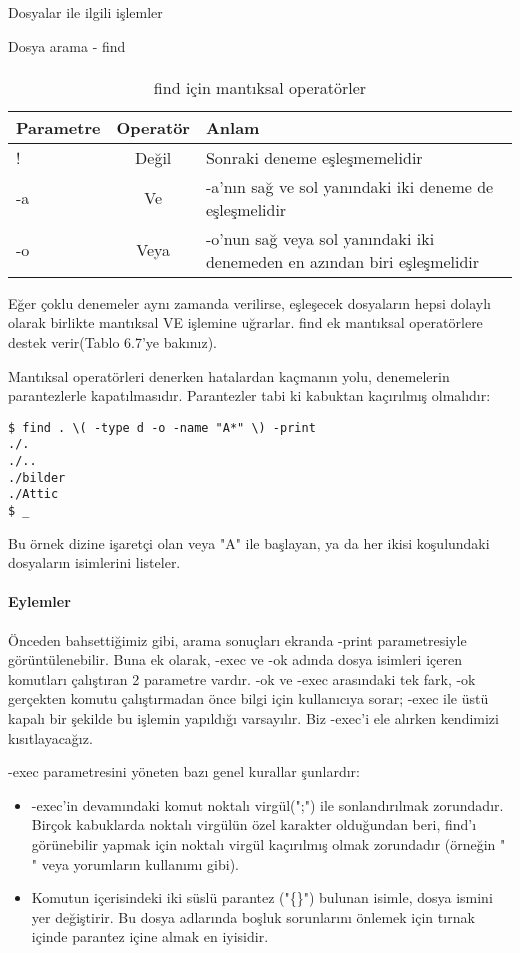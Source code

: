 \begin{section}{Dosyalar ile ilgili işlemler}
\begin{subsection}{Dosya arama - find}
\paragraph{}{
\begin {table}[H]
\caption {find için mantıksal operatörler} \label{tab:title} 
\begin{tabular}{l c l}
\hline
Parametre & Operatör & Anlam\\
\hline
! & Değil & Sonraki deneme eşleşmemelidir\\
-a & Ve & -a'nın sağ ve sol yanındaki iki deneme de eşleşmelidir\\
-o & Veya & -o'nun sağ veya sol yanındaki iki denemeden en azından biri eşleşmelidir\\
\hline
\end{tabular}
\end {table}
}

Eğer çoklu denemeler aynı zamanda verilirse, eşleşecek dosyaların hepsi dolaylı olarak birlikte mantıksal VE işlemine uğrarlar. find ek mantıksal operatörlere destek verir(Tablo 6.7'ye bakınız).

Mantıksal operatörleri denerken hatalardan kaçmanın yolu, denemelerin parantezlerle kapatılmasıdır. Parantezler tabi ki kabuktan kaçırılmış olmalıdır:

\begin{verbatim}
$ find . \( -type d -o -name "A*" \) -print
./.
./..
./bilder
./Attic
$ _
\end{verbatim}

Bu örnek dizine işaretçi olan veya "A" ile başlayan, ya da her ikisi koşulundaki dosyaların isimlerini listeler.

\paragraph{Eylemler} Önceden bahsettiğimiz gibi, arama sonuçları ekranda -print parametresiyle görüntülenebilir. Buna ek olarak, -exec ve -ok adında dosya isimleri içeren komutları çalıştıran 2 parametre vardır. -ok ve -exec arasındaki tek fark, -ok gerçekten komutu çalıştırmadan önce bilgi için kullanıcıya sorar; -exec ile üstü kapalı bir şekilde bu işlemin yapıldığı varsayılır. Biz -exec'i ele alırken kendimizi kısıtlayacağız.

-exec parametresini yöneten bazı genel kurallar şunlardır:
\begin{itemize}
\item -exec'in devamındaki komut noktalı virgül(";") ile sonlandırılmak zorundadır. Birçok kabuklarda noktalı virgülün özel karakter olduğundan beri, find'ı görünebilir yapmak için noktalı virgül kaçırılmış olmak zorundadır (örneğin "\\" veya yorumların kullanımı gibi).
\item Komutun içerisindeki iki süslü parantez ("\{\}") bulunan isimle, dosya ismini yer değiştirir. Bu dosya adlarında boşluk sorunlarını önlemek için tırnak içinde parantez içine almak en iyisidir.
\end{itemize}


\end{subsection}
\end{section}
